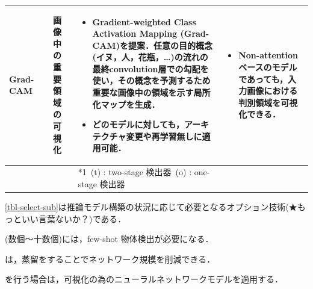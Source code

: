 \documentclass[originalpaper,fleqn]{jsaiart}     %
\begin{document}
\begin{table}
\begin{center}
\begin{tabularx}{\linewidth}{Xp{1.5cm}Xp{7cm}X}
            Grad-CAM & \cite{SCDVPB17,SCDVPB20} & 画像中の重要領域の可視化 & 
            \begin{itemize}
                \vspace{-0.7\baselineskip}
                \setlength{\leftskip}{-3mm}
                \item Gradient-weighted Class Activation Mapping (Grad-CAM)を提案．任意の目的概念(イヌ，人，花瓶，…)の流れの最終convolution層での勾配を使い，その概念を予測するため重要な画像中の領域を示す局所化マップを生成．
                \item どのモデルに対しても，アーキテクチャ変更や再学習無しに適用可能．
            \end{itemize}
            &
            \begin{itemize}
                \vspace{-0.7\baselineskip}
                \setlength{\leftskip}{-3mm}
                \item Non-attention ベースのモデルであっても，入力画像における判別領域を可視化できる．
            \end{itemize}
            \\
            \bottomrule
            &  &  & *1\ (t) : two-stage 検出器\quad *2\ (o) : one-stage 検出器 &  \\
        \end{tabularx}
    \end{center}
\end{table}%
\ref{tbl-select-sub}は推論モデル構築の状況に応じて必要となるオプション技術(★もっといい言葉ないか？)である．

(数個〜十数個)には，few-shot 物体検出が必要になる\cite{KLWYFD19,FZTT20,WHGDY20}．

は，蒸留をすることでネットワーク規模を削減できる\cite{LJY17}．

を行う場合は，可視化の為のニューラルネットワークモデル\cite{SCDVPB17,SCDVPB20}を適用する．
\end{document}
